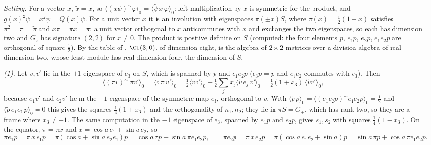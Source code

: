 \emph{Setting.} For a vector $x$, $\tilde x = x$, so $\langle (x\psi)^{\sim}\varphi \rangle_{0} = \langle \tilde\psi\,x\,\varphi \rangle_{0}$: left multiplication by $x$ is symmetric for the product, and $g(x)^{2}\psi = x^{2}\psi = Q(x)\psi$. For a unit vector $x$ it is an involution with eigenspaces $\pi(\pm x)S$, where $\pi(x) = \tfrac12(1 + x)$ satisfies $\pi^{2} = \pi = \tilde\pi$ and $x\pi = \pi x = \pi$; a unit vector orthogonal to $x$ anticommutes with $x$ and exchanges the two eigenspaces, so each has dimension two and $G_{x}$ has signature $(2,2)$ for $x \neq 0$. The product is positive definite on $S$ (computed: the four elements $p$, $e_{1}p$, $e_{2}p$, $e_{1}e_{2}p$ are orthogonal of square $\tfrac12$). By the table of , $\Cl(3,0)$, of dimension eight, is the algebra of $2 \times 2$ matrices over a division algebra of real dimension two, whose least module has real dimension four, the dimension of $S$.

\emph{(1).} Let $v, v'$ lie in the $+1$ eigenspace of $e_{3}$ on $S$, which is spanned by $p$ and $e_{1}e_{2}p$ ($e_{3}p = p$ and $e_{1}e_{2}$ commutes with $e_{3}$). Then
\[
\langle (\pi v)^{\sim}\,\pi v' \rangle_{0} = \langle \tilde v\,\pi\,v' \rangle_{0} = \tfrac12\langle \tilde v v' \rangle_{0} + \tfrac12\sum_{j} x_{j}\langle \tilde v\,e_{j}\,v' \rangle_{0} = \tfrac12(1 + x_{3})\,\langle \tilde v v' \rangle_{0},
\]
because $e_{1}v'$ and $e_{2}v'$ lie in the $-1$ eigenspace of the symmetric map $e_{3}$, orthogonal to $v$. With $\langle \tilde p\,p \rangle_{0} = \langle (e_{1}e_{2}p)^{\sim}e_{1}e_{2}p \rangle_{0} = \tfrac12$ and $\langle \tilde p\,e_{1}e_{2}\,p \rangle_{0} = 0$ this gives the squares $\tfrac14(1 + x_{3})$ and the orthogonality of $n_{1}, n_{2}$; they lie in $\pi S = G_{+}$, which has rank two, so they are a frame where $x_{3} \neq -1$. The same computation in the $-1$ eigenspace of $e_{3}$, spanned by $e_{1}p$ and $e_{2}p$, gives $s_{1}, s_{2}$ with squares $\tfrac14(1 - x_{3})$. On the equator, $\pi = \pi x$ and $x = \cos a\,e_{1} + \sin a\,e_{2}$, so
\[
\pi e_{1}p = \pi\,x\,e_{1}p = \pi(\cos a + \sin a\,e_{2}e_{1})p = \cos a\,\pi p - \sin a\,\pi e_{1}e_{2}p, \qquad
\pi e_{2}p = \pi\,x\,e_{2}p = \pi(\cos a\,e_{1}e_{2} + \sin a)p = \sin a\,\pi p + \cos a\,\pi e_{1}e_{2}p .
\]

